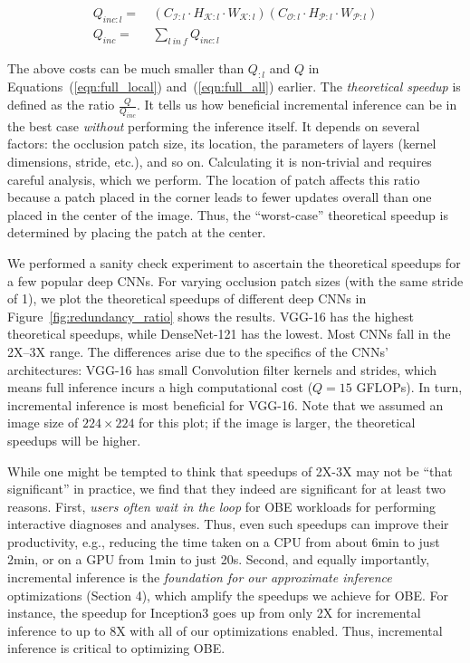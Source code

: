 \begin{align}
\label{eqn:inc_local}
Q_{inc:l} =&~ (C_{\mathcal{I}:l} \cdot H_{\mathcal{K}:l} \cdot W_{\mathcal{K}:l})  (C_{\mathcal{O}:l} \cdot H_{\mathcal{P}:l} \cdot W_{\mathcal{P}:l})\\
\label{eqn:inc_all}
Q_{inc} =&~ \sum_{l~\mathit{in}~f} Q_{inc:l}
\end{align}

The above costs can be much smaller than $Q_{:l}$ and $Q$ in Equations~(\ref{eqn:full_local}) and~(\ref{eqn:full_all}) earlier.
The \textit{theoretical speedup} is defined as the ratio $\frac{Q}{Q_{inc}}$. It tells us how beneficial incremental inference can be in the best case \textit{without} performing the inference itself. It depends on several factors: the occlusion patch size, its location, the parameters of layers (kernel dimensions, stride, etc.), and so on. Calculating it is non-trivial and requires careful analysis, which we perform. The location of patch affects this ratio because a patch placed in the corner leads to fewer updates overall than one placed in the center of the image. Thus, the ``worst-case'' theoretical speedup is determined by placing the patch at the center.

We performed a sanity check experiment to ascertain the theoretical speedups for a few popular deep CNNs. For varying occlusion patch sizes (with the same stride of 1), we plot the theoretical speedups of different deep CNNs in Figure~\ref{fig:redundancy_ratio} shows the results. VGG-16 has the highest theoretical speedups, while DenseNet-121 has the lowest. Most CNNs fall in the 2X--3X range. The differences arise due to the specifics of the CNNs' architectures: VGG-16 has small Convolution filter kernels and strides, which means full inference incurs a high computational cost ($Q = 15$ GFLOPs). In turn, incremental inference is most beneficial for VGG-16. Note that we assumed an image size of $224 \times 224$ for this plot; if the image is larger, the theoretical speedups will be higher.

While one might be tempted to think that speedups of 2X-3X may not be ``that significant'' in practice, we find that they indeed are significant for at least two reasons. First, \textit{users often wait in the loop} for OBE workloads for performing interactive diagnoses and analyses. Thus, even such speedups can improve their productivity, e.g., reducing the time taken on a CPU from about 6min to just 2min, or on a GPU from 1min to just 20s. Second, and equally importantly, incremental inference is the \textit{foundation for our approximate inference} optimizations (Section 4), which amplify the speedups we achieve for OBE. For instance, the speedup for Inception3 goes up from only 2X for incremental inference to up to 8X with all of our optimizations enabled. Thus, incremental inference is critical to optimizing OBE.

